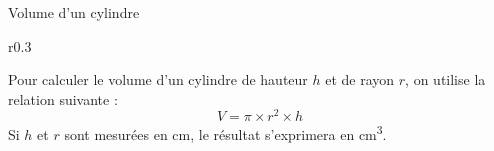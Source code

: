 % 
  
\begin{doc}{Volume d'un cylindre}
  \begin{wrapfigure}{r}{0.3\linewidth} 
    \centering
    \vspace*{-24pt}
  \end{wrapfigure}

  Pour calculer le volume d'un cylindre de hauteur $h$ et de rayon $r$, on utilise la relation suivante :
  \begin{equation*}
    V = \pi \times r^2 \times h
  \end{equation*}
  Si $h$ et $r$ sont mesurées en \unit{\cm}, le résultat s’exprimera en \unit{\cubic\cm}.
\end{doc}

